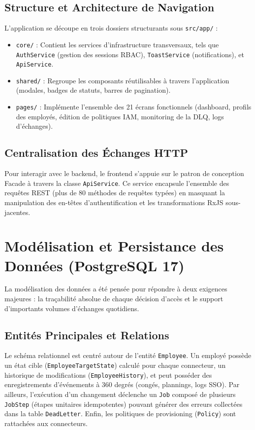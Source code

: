 \subsection{Structure et Architecture de Navigation}
L'application se découpe en trois dossiers structurants sous \texttt{src/app/} :
\begin{itemize}
    \item \texttt{core/} : Contient les services d'infrastructure transversaux, tels que \texttt{AuthService} (gestion des sessions RBAC), \texttt{ToastService} (notifications), et \texttt{ApiService}.
    \item \texttt{shared/} : Regroupe les composants réutilisables à travers l'application (modales, badges de statuts, barres de pagination).
    \item \texttt{pages/} : Implémente l'ensemble des 21 écrans fonctionnels (dashboard, profils des employés, édition de politiques IAM, monitoring de la DLQ, logs d'échanges).
\end{itemize}

\subsection{Centralisation des Échanges HTTP}
Pour interagir avec le backend, le frontend s'appuie sur le patron de conception Facade à travers la classe \texttt{ApiService}. Ce service encapsule l'ensemble des requêtes REST (plus de 80 méthodes de requêtes typées) en masquant la manipulation des en-têtes d'authentification et les transformations RxJS sous-jacentes.

\section{Modélisation et Persistance des Données (PostgreSQL 17)}
La modélisation des données a été pensée pour répondre à deux exigences majeures : la traçabilité absolue de chaque décision d'accès et le support d'importants volumes d'échanges quotidiens.

\subsection{Entités Principales et Relations}
Le schéma relationnel est centré autour de l'entité \texttt{Employee}. Un employé possède un état cible (\texttt{EmployeeTargetState}) calculé pour chaque connecteur, un historique de modifications (\texttt{EmployeeHistory}), et peut posséder des enregistrements d'événements à 360 degrés (congés, plannings, logs SSO). 
Par ailleurs, l'exécution d'un changement déclenche un \texttt{Job} composé de plusieurs \texttt{JobStep} (étapes unitaires idempotentes) pouvant générer des erreurs collectées dans la table \texttt{DeadLetter}. Enfin, les politiques de provisioning (\texttt{Policy}) sont rattachées aux connecteurs.

